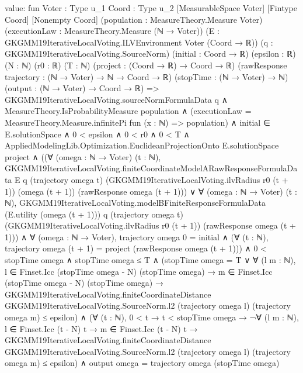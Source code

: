 \documentclass[10pt]{article}
\begin{document}
\begin{ReviewVerbatim}
value:
fun {Voter : Type u_1} {Coord : Type u_2} [MeasurableSpace Voter] [Fintype Coord] [Nonempty Coord]
    (population : MeasureTheory.Measure Voter) (executionLaw : MeasureTheory.Measure (ℕ → Voter))
    (E : GKGMM19IterativeLocalVoting.ILVEnvironment Voter (Coord → ℝ)) (q : GKGMM19IterativeLocalVoting.SourceNorm)
    (initial : Coord → ℝ) (epsilon : ℝ) (N : ℕ) (r0 : ℝ) (T : ℕ) (project : (Coord → ℝ) → Coord → ℝ)
    (rawResponse trajectory : (ℕ → Voter) → ℕ → Coord → ℝ) (stopTime : (ℕ → Voter) → ℕ)
    (output : (ℕ → Voter) → Coord → ℝ) =>
  GKGMM19IterativeLocalVoting.sourceNormFormulaData q ∧
    MeasureTheory.IsProbabilityMeasure population ∧
      (executionLaw = MeasureTheory.Measure.infinitePi fun (x : ℕ) => population) ∧
        initial ∈ E.solutionSpace ∧
          0 < epsilon ∧
            0 < r0 ∧
              0 < T ∧
                AppliedModelingLib.Optimization.EuclideanProjectionOnto E.solutionSpace project ∧
                  ((∀ (omega : ℕ → Voter) (t : ℕ),
                        GKGMM19IterativeLocalVoting.finiteCoordinateModelARawResponseFormulaData E q
                          (trajectory omega t) (GKGMM19IterativeLocalVoting.ilvRadius r0 (t + 1)) (omega (t + 1))
                          (rawResponse omega (t + 1))) ∨
                      ∀ (omega : ℕ → Voter) (t : ℕ),
                        GKGMM19IterativeLocalVoting.modelBFiniteResponseFormulaData (E.utility (omega (t + 1))) q
                          (trajectory omega t) (GKGMM19IterativeLocalVoting.ilvRadius r0 (t + 1))
                          (rawResponse omega (t + 1))) ∧
                    ∀ (omega : ℕ → Voter),
                      trajectory omega 0 = initial ∧
                        (∀ (t : ℕ), trajectory omega (t + 1) = project (rawResponse omega (t + 1))) ∧
                          0 < stopTime omega ∧
                            stopTime omega ≤ T ∧
                              (stopTime omega = T ∨
                                  ∀ (l m : ℕ),
                                    l ∈ Finset.Icc (stopTime omega - N) (stopTime omega) →
                                      m ∈ Finset.Icc (stopTime omega - N) (stopTime omega) →
                                        GKGMM19IterativeLocalVoting.finiteCoordinateDistance
                                            GKGMM19IterativeLocalVoting.SourceNorm.l2 (trajectory omega l)
                                            (trajectory omega m) ≤
                                          epsilon) ∧
                                (∀ (t : ℕ),
                                    0 < t →
                                      t < stopTime omega →
                                        ¬∀ (l m : ℕ),
                                            l ∈ Finset.Icc (t - N) t →
                                              m ∈ Finset.Icc (t - N) t →
                                                GKGMM19IterativeLocalVoting.finiteCoordinateDistance
                                                    GKGMM19IterativeLocalVoting.SourceNorm.l2 (trajectory omega l)
                                                    (trajectory omega m) ≤
                                                  epsilon) ∧
                                  output omega = trajectory omega (stopTime omega)
\end{ReviewVerbatim}
\end{document}
